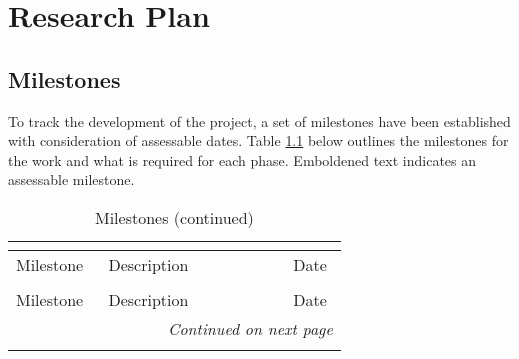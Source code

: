 \chapter[Milestones]{Research Plan}

\label{Chap:Milestones}

\section{Milestones}
To track the development of the project, a set of milestones have been established with consideration of assessable dates. 
Table \ref{tab:milestones} below outlines the milestones for the work and what is required for each phase.
Emboldened text indicates an assessable milestone.


\begin{center}
    \small
    \begin{longtable}{p{0.25\linewidth}p{0.5\linewidth}p{0.15\linewidth}}
        \caption{Milestones} \\
        \label{tab:milestones} \\
        \toprule
        Milestone & Description & Date \\
        \midrule
        \endfirsthead
        
        \caption{Milestones (continued)} \\
        \toprule
        Milestone & Description & Date \\
        \midrule
        \endhead
        
        \bottomrule
        \multicolumn{3}{r}{\textit{Continued on next page}} \\
        \endfoot
        
        \bottomrule
        \endlastfoot
        

\end{longtable}
\end{center}
